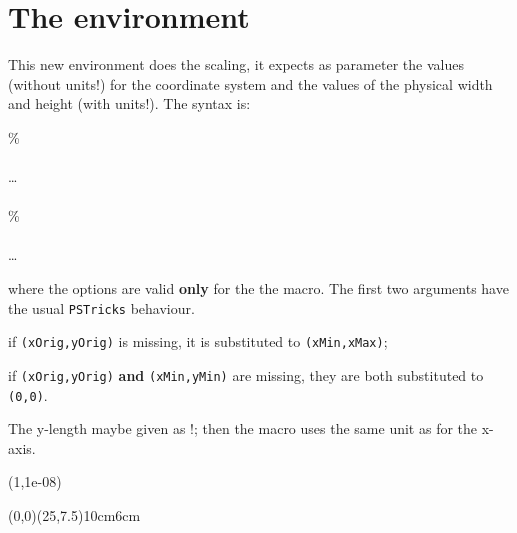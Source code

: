 \documentclass[11pt,english,BCOR=10mm,DIV=12,bibliography=totoc,parskip=false,headings=small,
    headinclude=false,footinclude=false,twoside]{pst-doc}
\begin{document}
\clearpage
\section{The  environment}
This new environment  does the scaling, it expects as parameter the values (without units!) for the
coordinate system and the values of the physical width and height (with units!). The syntax is:

\begin{BDef}
\OptArgs{}\%\\
\qquad{}\\
\ldots\\
\\[10pt]
\OptArgs{}\%\\
\qquad{}\\
\ldots\\
\end{BDef}

where the options are valid \textbf{only} for the the  macro. The first
two arguments have the usual \verb+PSTricks+ behaviour.
\begin{compactitem}
  \item if \verb+(xOrig,yOrig)+ is missing, it is substituted to  \verb+(xMin,xMax)+;
  \item if \verb+(xOrig,yOrig)+ \textbf{and} \verb+(xMin,yMin)+ are missing, they are both
  substituted to \verb+(0,0)+.
\end{compactitem}

The y-length maybe given as !; then the macro uses the same unit
as for the x-axis.

\begin{center}
\pstScalePoints(1,1e-08){}{}%
\begin{psgraph}[axesstyle=frame,xticksize=0 7.59,yticksize=0 25,%
    subticks=0,ylabelFactor=\cdot 10^8,
    Dx=5,dy=1\psyunit,Dy=1](0,0)(25,7.5){10cm}{6cm} %
   \listplot[linecolor=red,linewidth=2pt,showpoints=true]{\data}
\end{psgraph}
\end{center}
\end{document}
